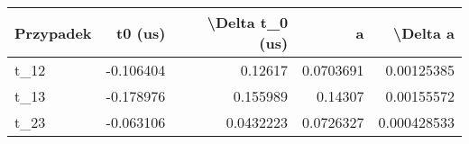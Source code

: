 \begin{tabular}{lrrrr}
\hline
 Przypadek   &   t0 (us) &   \textbackslash{}Delta t\_0 (us) &         a &    \textbackslash{}Delta a \\
\hline
 t\_12        & -0.106404 &         0.12617   & 0.0703691 & 0.00125385  \\
 t\_13        & -0.178976 &         0.155989  & 0.14307   & 0.00155572  \\
 t\_23        & -0.063106 &         0.0432223 & 0.0726327 & 0.000428533 \\
\hline
\end{tabular}